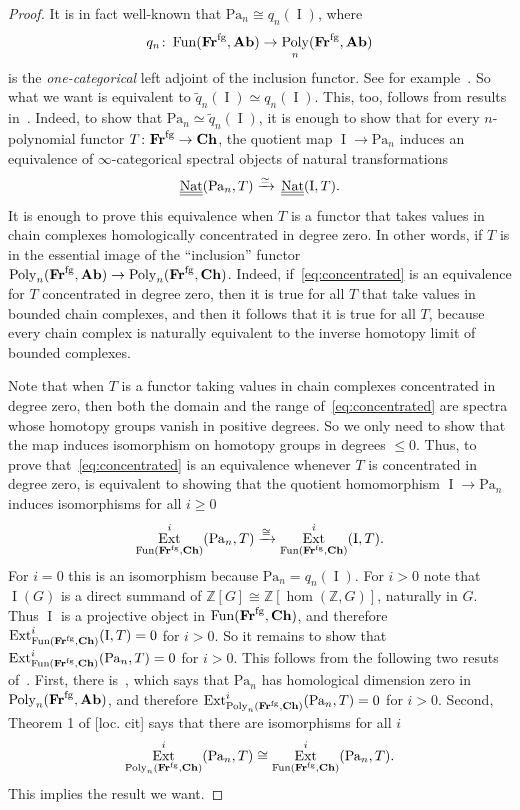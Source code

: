 \documentclass[psamsfonts]{amsart}
\theoremstyle{plain}
\theoremstyle{definition}
\theoremstyle{remark}
\newcommand{\Z}{\mathbb{Z}}
\newcommand{\catname}[1]{{\normalfont\textbf{#1}}}
\newcommand{\fr}{\allfr^{\mathrm{fg}}}
\newcommand{\allfr}{\catname{Fr}}
\newcommand{\ab}{\catname{Ab}}
\newcommand{\ch}{\catname{Ch}}
\newcommand{\Passi}{\mathrm{Pa}}
\newcommand{\ideal}{\operatorname{I}}
\DeclareMathOperator{\ext}{Ext}
\DeclareMathOperator{\nat}{Nat}
\DeclareMathOperator{\spectralNat}{\underline{\underline{\nat}}}
\DeclareMathOperator{\fun}{Fun}
\DeclareMathOperator{\poly}{Poly}
\begin{document}
\begin{proof}
It is in fact well-known that $\Passi_n\cong q_n(\ideal)$, where \[q_n\colon \fun(\fr, \ab)\to \poly_n(\fr, \ab)\] is the \emph{one-categorical} left adjoint of the inclusion functor. See for example~\cite[Proposition 3.7]{Djament-Pirashvili-Vespa_2016}. So what we want is equivalent to $\tilde q_n(\ideal)\simeq q_n(\ideal)$. This, too, follows from results in~\cite{Djament-Pirashvili-Vespa_2016}. Indeed, to show that $\Passi_n\simeq \tilde q_n(\ideal)$, it is enough to show that for every $n$-polynomial functor $T\colon \fr\to \ch$, the quotient map $\ideal\to \Passi_n$ induces an equivalence of $\infty$-categorical spectral objects of natural transformations
\begin{equation}\label{eq:concentrated}
\spectralNat(\Passi_n, T)\xrightarrow{\simeq} \\ \spectralNat(\ideal, T).
\end{equation}
It is enough to prove this equivalence when $T$ is a functor that takes values in chain complexes homologically concentrated in degree zero. In other words, if $T$ is in the essential image of the ``inclusion'' functor $\poly_n(\fr, \ab)\to \poly_n(\fr, \ch)$. Indeed, if~\eqref{eq:concentrated} is an equivalence for $T$ concentrated in degree zero, then it is true for all $T$ that take values in bounded chain complexes, and then it follows that it is true for all $T$, because every chain complex is naturally equivalent to the inverse homotopy limit of bounded complexes.

Note that when $T$ is a functor taking values in chain complexes concentrated in degree zero, then both the domain and the range of~\eqref{eq:concentrated} are spectra whose homotopy groups vanish in positive degrees. So we only need to show that the map induces isomorphism on homotopy groups in degrees $\le 0$. Thus, to prove that~\eqref{eq:concentrated} is an equivalence whenever $T$ is concentrated in degree zero, is equivalent to showing that the quotient homomorphism $\ideal\to \Passi_n$ induces isomorphisms for all $i\ge 0$
\[
\ext_{\fun(\fr, \ch)}^i(\Passi_n, T)\xrightarrow{\cong}\ext_{\fun(\fr, \ch)}^i(\ideal, T).
\]
For $i=0$ this is an isomorphism because $\Passi_n=q_n(\ideal).$ For $i>0$ note that $\ideal(G)$ is a direct summand of $\Z[G]\cong \Z[\hom(\Z, G)]$, naturally in $G$. Thus $\ideal$ is a projective object in $\fun(\fr, \ch)$, and therefore $\ext_{\fun(\fr, \ch)}^i(\ideal, T)=0$ for $i>0$. So it remains to show that $\ext_{\fun(\fr, \ch)}^i(\Passi_n, T)=0$ for $i>0$. This follows from the following two resuts of~\cite{Djament-Pirashvili-Vespa_2016}. First, there is~\cite[Corollary 4.3]{Djament-Pirashvili-Vespa_2016}, which says that $\Passi_n$ has homological dimension zero in $\poly_n(\fr, \ab)$, and therefore $\ext_{\poly_n(\fr, \ch)}^i(\Passi_n, T)=0$ for $i>0$. Second, Theorem 1 of [loc. cit] says that there are isomorphisms for all $i$
\[
\ext_{\poly_n(\fr, \ch)}^i(\Passi_n, T)\cong \ext_{\fun(\fr, \ch)}^i(\Passi_n, T).
\]
This implies the result we want.
\end{proof}
\end{document}
